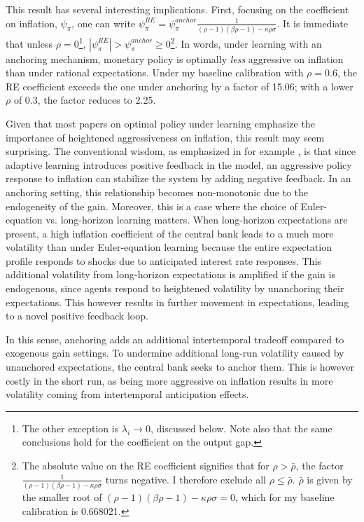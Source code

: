 \documentclass[11pt]{article}
\renewcommand{\[}{\begin{equation}}
\renewcommand{\]}{\end{equation}}
\begin{document}
This result has several interesting implications. First, focusing on the coefficient on inflation, $\psi_{\pi}$, one can write $\psi_{\pi}^{RE} = \psi_{\pi}^{anchor}\frac{1}{(\rho -1) (\beta  \rho -1)-\kappa  \rho  \sigma }$. It is immediate that unless $\rho=0$\footnote{The other exception is $\lambda_i \rightarrow 0$, discussed below. Note also that the same conclusions hold for the coefficient on the output gap.}, $|\psi_{\pi}^{RE}| >\psi_{\pi}^{anchor}\geq 0$\footnote{The absolute value on the RE coefficient signifies that for $\rho > \bar{\rho}$, the factor $\frac{1}{(\rho -1) (\beta  \rho -1)-\kappa  \rho  \sigma }$ turns negative. I therefore exclude all $\rho \leq \bar{\rho}$. $\bar{\rho}$ is given by the smaller root of $(\rho -1) (\beta  \rho -1)-\kappa  \rho  \sigma = 0$, which for my baseline calibration is 0.668021.}. In words, under learning with an anchoring mechanism, monetary policy is optimally \emph{less} aggressive on inflation than under rational expectations. Under my baseline calibration with $\rho=0.6$, the RE coefficient exceeds the one under anchoring by a factor of 15.06; with a lower $\rho$ of 0.3, the factor reduces to 2.25.

Given that most papers on optimal policy under learning emphasize the importance of heightened aggressiveness on inflation, this result may seem surprising. The conventional wisdom, as emphasized in for example \cite{assenza2019managing}, is that since adaptive learning introduces positive feedback in the model, an aggressive policy response to inflation can stabilize the system by adding negative feedback. In an anchoring setting, this relationship becomes non-monotonic due to the endogeneity of the gain. Moreover, this is a case where the choice of Euler-equation vs. long-horizon learning matters. When long-horizon expectations are present, a high inflation coefficient of the central bank leads to a much more volatility than under Euler-equation learning because the entire expectation profile responds to shocks due to anticipated interest rate responses. This additional volatility from long-horizon expectations is amplified if the gain is endogenous, since agents respond to heightened volatility by unanchoring their expectations. This however results in further movement in expectations, leading to a novel positive feedback loop.

In this sense, anchoring adds an additional intertemporal tradeoff compared to exogenous gain settings. To undermine additional long-run volatility caused by unanchored expectations, the central bank seeks to anchor them. This is however costly in the short run, as being more aggressive on inflation results in more volatility coming from intertemporal anticipation effects.
\end{document}
